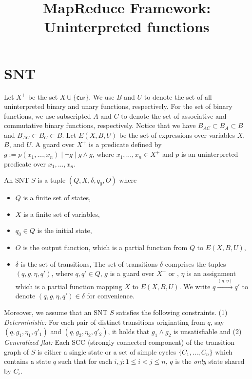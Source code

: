 \documentclass[runningheads,a4paper]{llncs}
\title{MapReduce Framework: Uninterpreted functions}
\author{}
\institute{}
\newcommand\cur{\mathsf{cur}}
\begin{document}
\maketitle

\section{SNT}
Let $X^+$ be the set $X\cup \{ \cur \}$.
We use $B$ and $U$ to denote the set of all uninterpreted binary and unary functions, respectively. For the set of binary functions, we use subscripted $A$ and $C$ to denote the set of associative and commutative binary functions, respectively. Notice that we have $B_{AC}\subset B_A \subset B$ and $B_{AC}\subset B_C \subset B$.
Let $E(X, B, U)$ be the set of expressions over variables $X$, $B$, and $U$.
A guard over $X^+$ is a predicate defined by $g:= p(x_1,\ldots,x_n) \mid \neg g \mid g\wedge g$, where $x_1,\ldots,x_n\in X^+$ and $p$ is an uninterpreted predicate over $x_1,\ldots,x_n$. 

\begin{definition}
An SNT $S$ is a tuple $(Q, X, \delta, q_0, O)$ where 
\begin{itemize}
\item $Q$ is a finite set of states, 
\item $X$ is a finite set of variables,  
\item $q_0 \in Q$ is the initial state, 
\item $O$ is the output function, which is a partial function from $Q$ to $E(X,B, U)$,
\item $\delta$ is the set of transitions,  The set of transitions $\delta$ comprises the tuples $(q, g, \eta, q')$, where $q,q'\in Q$, $g$ is a guard over $X^+$ or , $\eta$ is an assignment which is a partial function mapping $X$  to $E(X,B, U)$. We write $q \xrightarrow{(g,\eta)} q'$ to denote $(q,g,\eta,q') \in \delta$ for convenience. 
\end{itemize}
\end{definition}

Moreover, we assume that an SNT $S$ satisfies the following constraints. (1) \emph{Deterministic:} For each pair of distinct transitions originating from $q$, say $(q, g_1, \eta_1,q'_1)$ and $(q, g_2,\eta_2,q'_2)$, it holds that $g_1 \wedge g_2$ is unsatisfiable and (2) \emph{Generalized flat:} Each SCC (strongly connected component) of the transition graph of $S$ is either a single state or a set of simple cycles $\{C_1,\dots, C_n\}$ which contains a state $q$ such that for each $i,j: 1 \le i < j \le n$, $q$ is the \emph{only} state shared by $C_i$.
\end{document}

